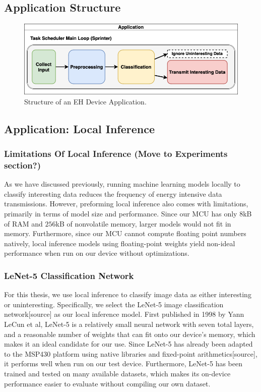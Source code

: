 \documentclass[twoside]{report}
\begin{document}
\subsection{Application Structure}
\begin{figure}[ht]
    \centering
    \includegraphics[width=0.9\linewidth]{method/struct.png}
    \caption{Structure of an EH Device Application.}
    \label{fig:struct}
\end{figure}

\subsection{Application: Local Inference}
\subsubsection{Limitations Of Local Inference (Move to Experiments section?)}
As we have discussed previously, running machine learning models locally to classify interesting 
data reduces the frequency of energy intensive data transmissions. 
However, preforming local inference also comes with limitations, 
primarily in terms of model size and performance. Since our MCU has only $8$kB of RAM 
and $256$kB of nonvolatile memory, larger models would not fit in memory. Furthermore, 
since our MCU cannot compute floating point numbers natively, local inference models 
using floating-point weights yield non-ideal performance when run on our device without optimizations.

\subsubsection{LeNet-5 Classification Network}
For this thesis, we use local inference to classify image data as either interesting or uninteresting. 
Specifically, we select the LeNet-5 image classification network[source] as our local inference model. 
First published in 1998 by Yann LeCun et al, LeNet-5 is a relatively small neural network with seven 
total layers, and a reasonable number of weights that can fit onto our device's memory, 
which makes it an ideal candidate for our use. Since LeNet-5 has 
already been adapted to the MSP430 platform using native libraries and fixed-point arithmetics[source], 
it performs well when run on our test device. Furthermore, LeNet-5 has been trained and tested on many 
available datasets, which makes its on-device performance easier to evaluate without compiling our own dataset.
\end{document}
